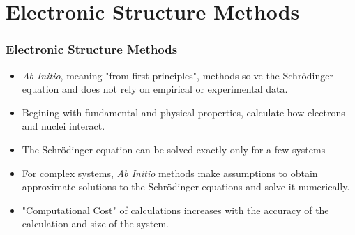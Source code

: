 \documentclass[slidestop,mathserif,compress,xcolor=svgnames]{beamer}
\begin{document}
\section{Electronic Structure Methods}
\begin{frame}
  \frametitle{\small Electronic Structure Methods}
  \begin{block}{}
    \begin{itemize}
      \item \emph{Ab Initio}, meaning "from first principles", methods solve the Schr\"{o}dinger equation and does not rely on empirical or experimental data. 
      \item Begining with fundamental and physical properties, calculate how electrons and nuclei interact.
      \item The Schr\"{o}dinger equation can be solved exactly only for a few systems
      \item For complex systems, \emph{Ab Initio} methods make assumptions to obtain approximate solutions to the  Schr\"{o}dinger equations and solve it numerically.
      \item "Computational Cost" of calculations increases with the accuracy of the calculation and size of the system.
    \end{itemize}
  \end{block}
\end{frame}
\end{document}
